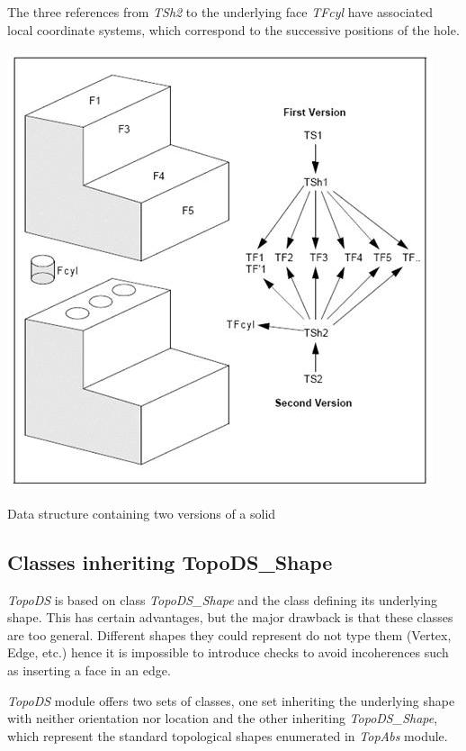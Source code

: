 The three references from {\itshape T\+Sh2} to the underlying face {\itshape T\+Fcyl} have associated local coordinate systems, which correspond to the successive positions of the hole. 
\begin{DoxyImage}
\begin{center}
 \includegraphics[width=\textwidth,height=\textheight/2,keepaspectratio=true]{modeling_data_image013.png}
\end{center}
\caption{Data structure containing two versions of a solid}
\end{DoxyImage}


\subsection*{Classes inheriting Topo\+D\+S\+\_\+\+Shape }

{\itshape Topo\+DS} is based on class {\itshape Topo\+D\+S\+\_\+\+Shape} and the class defining its underlying shape. This has certain advantages, but the major drawback is that these classes are too general. Different shapes they could represent do not type them (Vertex, Edge, etc.) hence it is impossible to introduce checks to avoid incoherences such as inserting a face in an edge.

{\itshape Topo\+DS} module offers two sets of classes, one set inheriting the underlying shape with neither orientation nor location and the other inheriting {\itshape Topo\+D\+S\+\_\+\+Shape}, which represent the standard topological shapes enumerated in {\itshape Top\+Abs} module.

